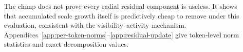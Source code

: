 The clamp does not prove every radial residual component is useless.
It shows that accumulated scale growth itself is predictively cheap to remove under this evaluation, consistent with the visibility--activity mechanism.
Appendices~\ref{app:per-token-norms}--\ref{app:residual-update} give token-level norm statistics and exact decomposition values.
